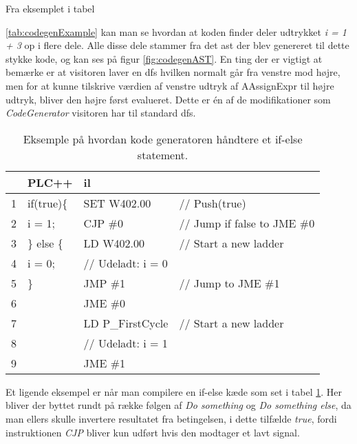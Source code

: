 Fra eksemplet i tabel {\ref{tab:codegenExample} kan man se hvordan at koden finder deler udtrykket \textit{i = 1 + 3} op i flere dele. Alle disse dele stammer fra det \gls{ast} der blev genereret til dette stykke kode, og kan ses på figur \ref{fig:codegenAST}. En ting der er vigtigt at bemærke er at visitoren laver en \gls{dfs} hvilken normalt går fra venstre mod højre, men for at kunne tilskrive værdien af venstre udtryk af AAssignExpr til højre udtryk, bliver den højre først evalueret. Dette er én af de modifikationer som \textit{CodeGenerator} visitoren har til standard \gls{dfs}.


\begin{table}[h]
    \centering\ttfamily
    \begin{tabular}{l|l|l l}
         &PLC++                 & \gls{il} \\\hline
        1&if(true)\{            & SET W402.00       &// Push(true)\\
        2&  i = 1;              & CJP \#0           &// Jump if false to JME \#0\\
        3&\} else \{            & LD W402.00        &// Start a new ladder\\
        4&  i = 0;              & // Udeladt: i = 0\\
        5& \}                   & JMP \#1           &// Jump to JME \#1\\
        6&                      & JME \#0           &\\
        7&                      & LD P\_FirstCycle  &// Start a new ladder\\
        8&                      & // Udeladt: i = 1\\
        9&                      & JME \#1
    \end{tabular}
    \caption{Eksemple på hvordan kode generatoren håndtere et if-else statement.}
    \label{tab:codegenIf}
\end{table}

Et ligende eksempel er når man compilere en if-else kæde som set i tabel \ref{tab:codegenIf}. Her bliver der byttet rundt på række følgen af \textit{Do something} og \textit{Do something else}, da man ellers skulle invertere resultatet fra betingelsen, i dette tilfælde \textit{true}, fordi instruktionen \textit{CJP} bliver kun udført hvis den modtager et lavt signal.

}
